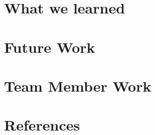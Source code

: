 \documentclass[12pt]{article}
\begin{document}
\section{What we learned}
\section{Future Work}
\section{Team Member Work}
\section{References}

\begin{thebibliography}{99}
\end{thebibliography}
\end{document}

